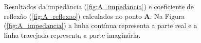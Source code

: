 
\newcommand\scalex{1}
\newcommand\scaley{1}
\newcommand\scaleA{0.5}

\begin{figure}
\begin{subfigure}{\scaleA \textwidth}
  
\end{subfigure}%
\begin{subfigure}{\scaleA \textwidth}
  
\end{subfigure}
\caption{Resultados da impedância (\ref{fig:A_impedancia}) e coeficiente de reflexão (\ref{fig:A_reflexao}) calculados no ponto $\textbf{A}$. Na Figura (\ref{fig:A_impedancia}) a linha contínua representa a parte real e a linha tracejada representa a parte imaginária.}
\label{fig:resultados_A}
\end{figure}

